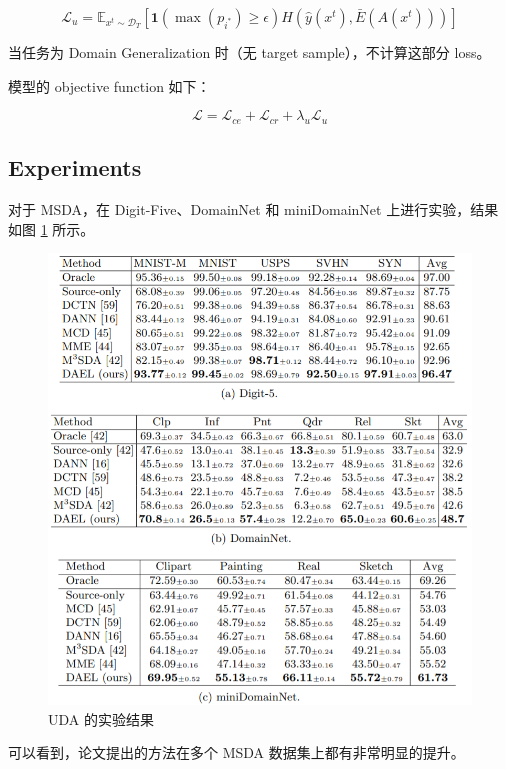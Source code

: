 \documentclass[UTF8]{ctexart}
\begin{document}
$$
\mathcal{L}_{u}=\mathbb{E}_{x^{t} \sim \mathcal{D}_{T}}\left[\mathbf{1}\left(\max \left(p_{i^{*}}\right) \geq \epsilon\right) H\left(\hat{y}\left(x^{t}\right), \bar{E}\left(A\left(x^{t}\right)\right)\right)\right]
$$

当任务为 Domain Generalization 时（无 target sample），不计算这部分 loss。

模型的 objective function 如下：

$$
\mathcal{L}=\mathcal{L}_{c e}+\mathcal{L}_{c r}+\lambda_{u} \mathcal{L}_{u}
$$

\subsection{Experiments}

对于 MSDA，在 Digit-Five、DomainNet 和 miniDomainNet 上进行实验，结果如图 \ref{fig:UDA} 所示。

\begin{figure}[ht]
    \centering
    \includegraphics[scale=0.5]{20200927_Experiment_UDA.png}
    \caption{UDA 的实验结果}
    \label{fig:UDA}
\end{figure}

可以看到，论文提出的方法在多个 MSDA 数据集上都有非常明显的提升。
\end{document}
